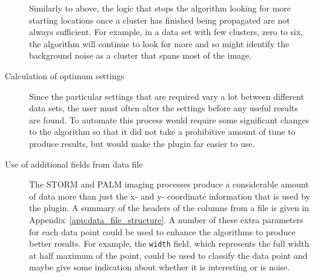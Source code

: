 \begin{description}
		Similarly to above, the logic that stops the algorithm looking for
		more starting locations once a cluster has finished being propagated
		are not always sufficient. For example, in a data set with few
		clusters, zero to six, the algorithm will continue to look for more and
		so might identify the background noise as a cluster that spans most of
		the image.

	\item[Calculation of optimum settings] \hfill

		Since the particular settings that are required vary a lot between
		different data sets, the user must often alter the settings before any
		useful results are found. To automate this process would require some
		significant changes to the algorithm so that it did not take a
		prohibitive amount of time to produce results, but would make the
		plugin far easier to use.

	\item[Use of additional fields from data file] \hfill

		The STORM and PALM imaging processes produce a considerable amount of
		data more than just the x- and y- coordinate information that is used
		by the plugin. A summary of the headers of the columns from a file is
		given in Appendix~\ref{app:data_file_structure}. A number of these
		extra parameters for each data point could be used to enhance the
		algorithms to produce better results. For example, the \texttt{width}
		field, which represents the full width at half maximum of the point,
		could be used to classify the data point and maybe give some indication
		about whether it is interesting or is noise.

\end{description}
